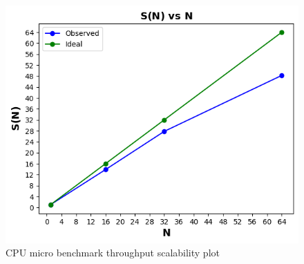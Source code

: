\documentclass{iitbreport}
\begin{document}
\begin{figure}[!htb]
  \centering
  \includegraphics[width=\linewidth]{Images/cpu_micro_benchmark_scalability.png}
  \caption{CPU micro benchmark throughput scalability plot}
  \label{cpu_micro_bench_mark_scalability}
\end{figure}
\end{document}
